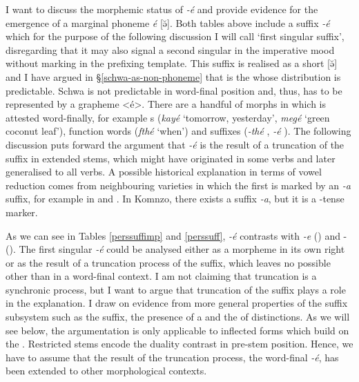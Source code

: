 I want to discuss the morphemic status of \emph{-é} and provide evidence for the emergence of a marginal phoneme \emph{é} [ə̆]. Both tables above include a suffix \emph{-é} which for the purpose of the following discussion I will call `first  singular suffix', disregarding that it may also signal a second singular in the imperative mood without  marking in the prefixing template. This suffix is realised as a short  [ə̆] and I have argued in {\S}\ref{schwa-as-non-phoneme} that  is the  whose distribution is predictable. Schwa is not predictable in word-final position and, thus, has to be represented by a grapheme <é>. There are a handful of morphs in which  is attested word-finally, for example s (\emph{kayé} `tomorrow, yesterday', \emph{megé} `green coconut leaf'), function words (\emph{fthé} `when') and suffixes (\emph{-thé} {\Adlzr}, \emph{-é} \Fsg{}). The following discussion puts forward the argument that \emph{-é} is the result of a truncation of the  suffix in extended stems, which might have originated in some verbs and later generalised to all verbs. A possible historical explanation in terms of vowel reduction comes from neighbouring varieties in which the first  is marked by an \emph{-a} suffix, for example in  and . In Komnzo, there exists a suffix \emph{-a}, but it is a -tense marker.

As we can see in Tables \ref{perssuffimp} and \ref{perssuff}, \emph{-é} contrasts with \emph{-e} (\Fnsg) and -\Zero{} (\Stsg). The first singular \emph{-é} could be analysed either as a morpheme in its own right or as the result of a truncation process of the  suffix, which leaves no possible  other than  in a word-final context. I am not claiming that truncation is a synchronic process, but I want to argue that truncation of the  suffix plays a role in the explanation. I draw on evidence from more general properties of the suffix subsystem such as the  suffix, the presence of a  and the  of  distinctions. As we will see below, the argumentation is only applicable to inflected forms which build on the . Restricted stems encode the duality contrast in pre-stem position. Hence, we have to assume that the result of the truncation process, the word-final  \emph{-é}, has been extended to other morphological contexts.

